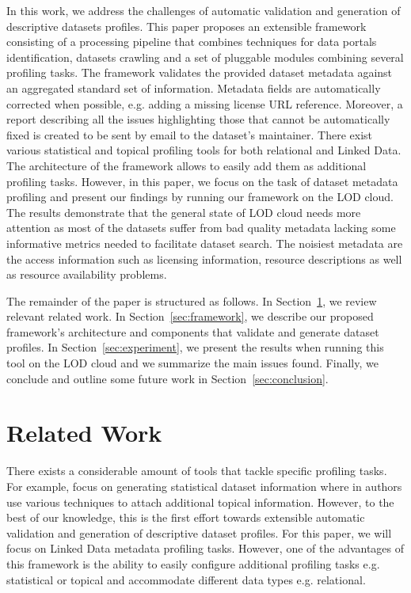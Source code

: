 \documentclass[runningheads,a4paper]{llncs}
\begin{document}
In this work, we address the challenges of automatic validation and generation of descriptive datasets profiles. This paper proposes an extensible framework consisting of a processing pipeline that combines techniques for data portals identification, datasets crawling and a set of pluggable modules combining several profiling tasks. The framework validates the provided dataset metadata against an aggregated standard set of information. Metadata fields are automatically corrected when possible, e.g. adding a missing license URL reference. Moreover, a report describing all the issues highlighting those that cannot be automatically fixed is created to be sent by email to the dataset's maintainer. There exist various statistical and topical profiling tools for both relational and Linked Data. The architecture of the framework allows to easily add them as additional profiling tasks. However, in this paper, we focus on the task of dataset metadata profiling and present our findings by running our framework on the LOD cloud. The results demonstrate that the general state of LOD cloud needs more attention as most of the datasets suffer from bad quality metadata lacking some informative metrics needed to facilitate dataset search. The noisiest metadata are the access information such as licensing information, resource descriptions as well as resource availability problems.

The remainder of the paper is structured as follows. In Section~\ref{sec:related-work}, we review relevant related work. In Section~\ref{sec:framework}, we describe our proposed framework's architecture and components that validate and generate dataset profiles. In Section~\ref{sec:experiment}, we present the results when running this tool on the LOD cloud and we summarize the main issues found. Finally, we conclude and outline some future work in Section~\ref{sec:conclusion}.


\section{Related Work}
\label{sec:related-work}
There exists a considerable amount of tools that tackle specific profiling tasks. For example, \cite{6816740}\cite{makela-aether-2014}\cite{forchhammer_profiles_2014} focus on generating statistical dataset information where in \cite{6690016}\cite{scalableApproach} authors use various techniques to attach additional topical information. However, to the best of our knowledge, this is the first effort towards extensible automatic validation and generation of descriptive dataset profiles. For this paper, we will focus on Linked Data metadata profiling tasks. However, one of the advantages of this framework is the ability to easily configure additional profiling tasks e.g. statistical or topical and accommodate different data types e.g. relational.\\
\end{document}
